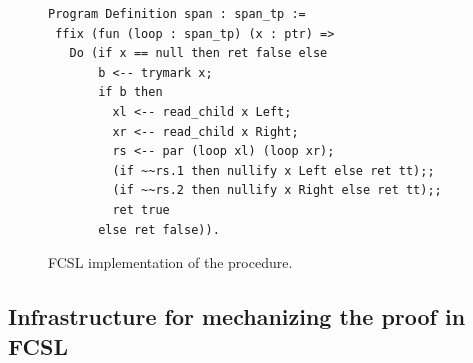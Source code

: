 

{\setlength{\belowcaptionskip}{-10pt} 
\begin{figure}[t!]
{\centering 
\begin{lstlisting}[basicstyle=\footnotesize\ttfamily]
Program Definition span : span_tp :=
 ffix (fun (loop : span_tp) (x : ptr) =>
   Do (if x == null then ret false else 
       b <-- trymark x;
       if b then
         xl <-- read_child x Left;
         xr <-- read_child x Right;
         rs <-- par (loop xl) (loop xr);
         (if ~~rs.1 then nullify x Left else ret tt);;
         (if ~~rs.2 then nullify x Right else ret tt);;
         ret true
       else ret false)). 
\end{lstlisting}
\vspace{-7pt}   
}
\caption{FCSL implementation of the  procedure.}
\label{fig:coq-span}
\end{figure}
}

\subsection{Infrastructure for mechanizing the proof in FCSL}
\label{sec:inform-proof-devel}

